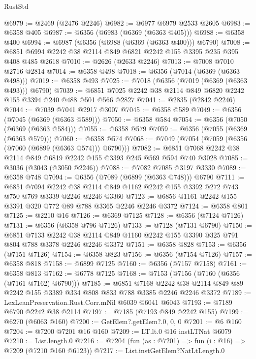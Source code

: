 \begin{lexlean}{RustStd}
\begin{coremodule}
{\begin{coremodule}
{{{{{{{{{{{{{{{{{{{{{{{{{{@6979 := @2469 (@2476 @2246)
@6982 := @6977 @6979 @2533 @2605
@6983 := @6358 @405
@6987 := @6356 (@6983 (@6369 (@6363 @405)))
@6988 := @6358 @400
@6994 := @6987 (@6356 (@6988 (@6369 (@6363 @400))) @6790)
@7008 := @6851 @6994 @2242 @38 @2114 @849 @6821 @2242 @155 @3395 @235 @395 @408 @485 @2618
@7010 := @2626 (@2633 @2246)
@7013 := @7008 @7010 @2716 @2814
@7014 := @6358 @498
@7018 := @6356 (@7014 (@6369 (@6363 @498)))
@7019 := @6358 @493
@7025 := @7018 (@6356 (@7019 (@6369 (@6363 @493))) @6790)
@7039 := @6851 @7025 @2242 @38 @2114 @849 @6820 @2242 @155 @3394 @240 @488 @501 @566 @2827
@7041 := @2835 (@2842 @2246)
@7044 := @7039 @7041 @2917 @3007
@7045 := @6358 @589
@7049 := @6356 (@7045 (@6369 (@6363 @589)))
@7050 := @6358 @584
@7054 := @6356 (@7050 (@6369 (@6363 @584)))
@7055 := @6358 @579
@7059 := @6356 (@7055 (@6369 (@6363 @579)))
@7060 := @6358 @574
@7068 := @7049 (@7054 (@7059 (@6356 (@7060 (@6899 (@6363 @574))) @6790)))
@7082 := @6851 @7068 @2242 @38 @2114 @849 @6819 @2242 @155 @3393 @245 @569 @594 @740 @3028
@7085 := @3036 (@3043 (@3050 @2246))
@7088 := @7082 @7085 @3197 @3330
@7089 := @6358 @748
@7094 := @6356 (@7089 (@6899 (@6363 @748))) @6790
@7111 := @6851
    @7094
    @2242
    @38
    @2114
    @849
    @1162
    @2242
    @155
    @3392
    @272
    @743
    @750
    @769
    @3339
    @2246
    @2246
    @3360
@7123 := @6856 @1161 @2242 @155 @3391 @320 @772 @89 @788 @3365 @2246 @2246 @3372
@7124 := @6358 @801
@7125 := @2210 @16
@7126 := @6369 @7125
@7128 := @6356 (@7124 @7126)
@7131 := @6356 (@6358 @796 @7126)
@7133 := @7128 (@7131 @6790)
@7150 := @6851
    @7133
    @2242
    @38
    @2114
    @849
    @1160
    @2242
    @155
    @3390
    @325
    @791
    @804
    @788
    @3378
    @2246
    @2246
    @3372
@7151 := @6358 @828
@7153 := @6356 (@7151 @7126)
@7154 := @6358 @823
@7156 := @6356 (@7154 @7126)
@7157 := @6358 @818
@7158 := @6899 @7125
@7160 := @6356 (@7157 @7158)
@7161 := @6358 @813
@7162 := @6778 @7125
@7168 := @7153 (@7156 (@7160 (@6356 (@7161 @7162) @6790)))
@7185 := @6851
    @7168
    @2242
    @38
    @2114
    @849
    @89
    @2242
    @155
    @3389
    @334
    @808
    @833
    @788
    @3385
    @2246
    @2246
    @3372
@7189 := LexLeanPreservation.Rust.Corr.mNil @6039 @6041 @6043
@7193 := @7189 @6790 @2242 @38 @2114
@7197 := @7185 (@7193 @849 @2242 @155)
@7199 := @6270 (@6063 @160)
@7200 := GetElem?.getElem?.{0, 0, 0}
@7201 := @6 @160
@7204 := @7200 @7201 @16 @160
@7209 := LT.lt.{0} @16 instLTNat @6079
@7210 := List.length.{0}
@7216 := @7204 (fun (as : @7201) => fun (i : @16) => @7209 (@7210 @160 @6123))
@7217 := List.instGetElem?NatLtLength.{0}
}}}}}}}}}}}}}}}}}}}}}}}}}}
\end{coremodule}}
\end{coremodule}
\end{lexlean}
